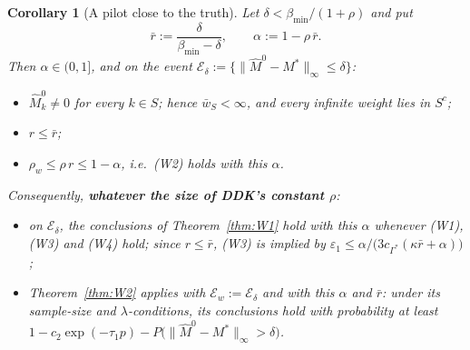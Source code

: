 \documentclass[11pt,a4paper]{article}
\numberwithin{equation}{section}
\theoremstyle{plain}
\newtheorem{corollary}[theorem]{Corollary}
\theoremstyle{remark}
\begin{document}
\begin{corollary}[A pilot close to the truth]\label{cor:W3}
Let $\delta < \beta_{\min}/(1+\rho)$ and put
\[
  \bar r := \frac{\delta}{\beta_{\min}-\delta},
  \qquad
  \alpha := 1-\rho\,\bar r .
\]
Then $\alpha \in (0,1]$, and on the event
$\mathcal E_\delta := \{\|\hat M^0-M^*\|_\infty \le \delta\}$:
\begin{itemize}
  \item[(i)] $\hat M^0_k \neq 0$ for every $k \in S$; hence $\bar w_S < \infty$,
        and every infinite weight lies in $S^c$;
  \item[(ii)] $r \le \bar r$;
  \item[(iii)] $\rho_w \le \rho\, r \le 1-\alpha$, i.e.\ (W2) holds with this $\alpha$.
\end{itemize}
Consequently, \textbf{whatever the size of DDK's constant $\rho$}:
\begin{itemize}
  \item[(a)] on $\mathcal E_\delta$, the conclusions of Theorem~\ref{thm:W1} hold with this
        $\alpha$ whenever (W1), (W3) and (W4) hold; since $r \le \bar r$, (W3) is implied by
        $\varepsilon_1 \le \alpha / \big(3c_{\Gamma^*}(\kappa\bar r + \alpha)\big)$;
  \item[(b)] Theorem~\ref{thm:W2} applies with $\mathcal E_w := \mathcal E_\delta$ and with this
        $\alpha$ and $\bar r$: under its sample-size and $\lambda$-conditions, its conclusions hold
        with probability at least
        $1 - c_2\exp(-\tau_1 p) - P\big(\|\hat M^0-M^*\|_\infty > \delta\big)$.
\end{itemize}
\end{corollary}
\end{document}
